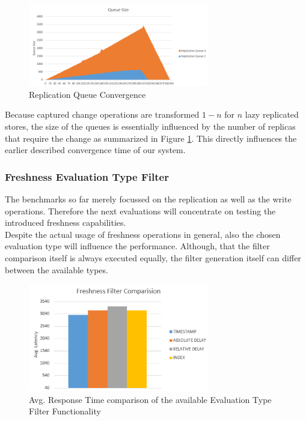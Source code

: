 \begin{figure}[t] 
    \centering 
    \includegraphics[width=0.7\textwidth]{Figures/queuesize24.PNG}
    \caption{Replication Queue Convergence}
    \label{fig:converge24}
\end{figure}


Because captured change operations are transformed $1-n$ for $n$ lazy replicated stores, the size of the queues is essentially influenced by the number of replicas that
require the change as summarized in Figure \ref{fig:converge24}. This directly influences the earlier described convergence time of our system.







\subsubsection{Freshness Evaluation Type Filter} 

The benchmarks so far merely focussed on the replication as well as the write operations.
Therefore the next evaluations will concentrate on testing the introduced freshness capabilities.\\

Despite the actual usage of freshness operations in general, also the chosen evaluation type will influence the performance.
Although, that the filter comparison itself is always executed equally, the filter generation itself can differ between the available types.

\begin{figure}[t] 
    \centering 
    \includegraphics[width=0.7\textwidth]{Figures/freshness_comp.PNG}
    \caption{Avg. Response Time comparison of the available Evaluation Type Filter Functionality }
    \label{fig:eval_type}
\end{figure}

